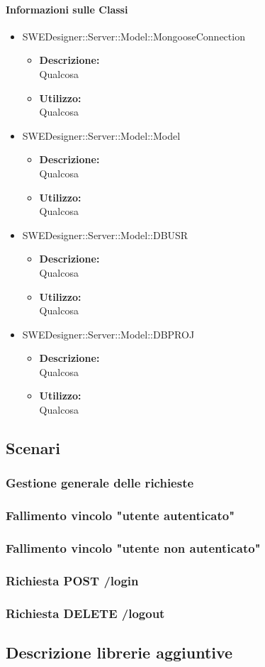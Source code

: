 		\paragraph{Informazioni sulle Classi}
		\begin{itemize}
			\item SWEDesigner::Server::Model::MongooseConnection
			\begin{itemize}
				\item \textbf{Descrizione: }\\
				Qualcosa
				\item \textbf{Utilizzo: }\\
				Qualcosa
			\end{itemize}
			\item SWEDesigner::Server::Model::Model
			\begin{itemize}
				\item \textbf{Descrizione: }\\
				Qualcosa
				\item \textbf{Utilizzo: }\\
				Qualcosa
			\end{itemize}
			\item SWEDesigner::Server::Model::DBUSR
			\begin{itemize}
				\item \textbf{Descrizione: }\\
				Qualcosa
				\item \textbf{Utilizzo: }\\
				Qualcosa
			\end{itemize}
			\item SWEDesigner::Server::Model::DBPROJ
			\begin{itemize}
				\item \textbf{Descrizione: }\\
				Qualcosa
				\item \textbf{Utilizzo: }\\
				Qualcosa
			\end{itemize}
		\end{itemize}
		
	
	\subsection{Scenari}
		\subsubsection{Gestione generale delle richieste}
		\subsubsection{Fallimento vincolo "utente autenticato"}
		\subsubsection{Fallimento vincolo "utente non autenticato"}
		\subsubsection{Richiesta POST /login}
		\subsubsection{Richiesta DELETE /logout}
	
	\subsection{Descrizione librerie aggiuntive}